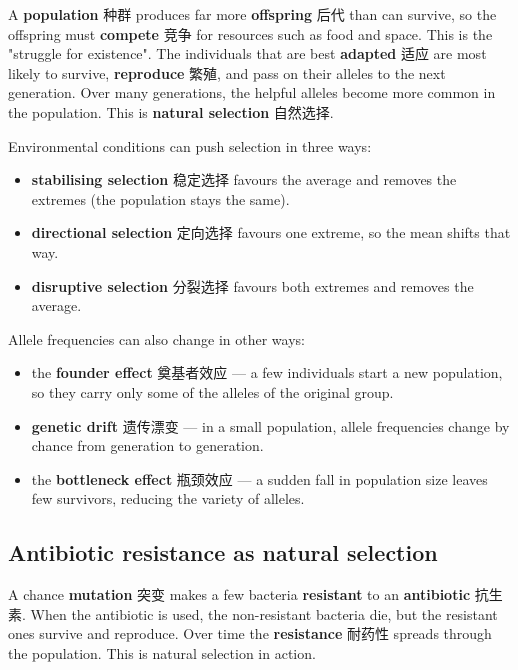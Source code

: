 \documentclass[11pt]{article}
\begin{document}
A \textbf{population} 种群 produces far more \textbf{offspring} 后代 than can survive, so the offspring must \textbf{compete} 竞争 for resources such as food and space. This is the "struggle for existence". The individuals that are best \textbf{adapted} 适应 are most likely to survive, \textbf{reproduce} 繁殖, and pass on their alleles to the next generation. Over many generations, the helpful alleles become more common in the population. This is \textbf{natural selection} 自然选择.

Environmental conditions can push selection in three ways:

\begin{itemize}
\item \textbf{stabilising selection} 稳定选择 favours the average and removes the extremes (the population stays the same).

\item \textbf{directional selection} 定向选择 favours one extreme, so the mean shifts that way.

\item \textbf{disruptive selection} 分裂选择 favours both extremes and removes the average.

\end{itemize}

Allele frequencies can also change in other ways:

\begin{itemize}
\item the \textbf{founder effect} 奠基者效应 — a few individuals start a new population, so they carry only some of the alleles of the original group.

\item \textbf{genetic drift} 遗传漂变 — in a small population, allele frequencies change by chance from generation to generation.

\item the \textbf{bottleneck effect} 瓶颈效应 — a sudden fall in population size leaves few survivors, reducing the variety of alleles.

\end{itemize}

\subsection*{Antibiotic resistance as natural selection}

A chance \textbf{mutation} 突变 makes a few bacteria \textbf{resistant} to an \textbf{antibiotic} 抗生素. When the antibiotic is used, the non-resistant bacteria die, but the resistant ones survive and reproduce. Over time the \textbf{resistance} 耐药性 spreads through the population. This is natural selection in action.
\end{document}

